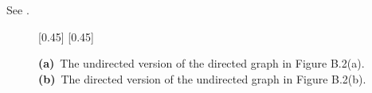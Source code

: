 See .
\begin{figure}[htb]
    \subcaptionbox{\label{fig:B.4-5a}}[0.45\textwidth]{}
    \subcaptionbox{\label{fig:B.4-5b}}[0.45\textwidth]{}
    \caption{\textbf{(a)}\, The undirected version of the directed graph in Figure B.2(a).\,
    \textbf{(b)}\, The directed version of the undirected graph in Figure B.2(b).} \label{fig:B.4-5}
\end{figure}
